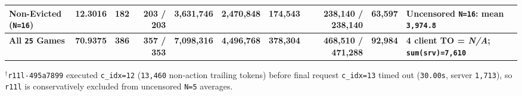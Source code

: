 \documentclass[10pt]{article}
\newcommand{\code}[1]{\texttt{#1}}
\newcommand{\na}{\textit{N/A}}
\begin{document}
\begin{table}[t]
{\begin{tabular}{@{}l r r r r r r r r l@{}}
\textbf{Non-Evicted (\code{N=16})} & \textbf{12.3016} & \textbf{182} & \textbf{203 / 203} & \textbf{3,631,746} & \textbf{2,470,848} & \textbf{174,543} & \textbf{238,140 / 238,140} & \textbf{63,597} & \textbf{Uncensored \code{N=16}: mean \code{3,974.8}} \\
\midrule
\textbf{All \code{25} Games} & \textbf{70.9375} & \textbf{386} & \textbf{357 / 353} & \textbf{7,098,316} & \textbf{4,496,768} & \textbf{378,304} & \textbf{468,510 / 471,288} & \textbf{92,984} & \textbf{4 client TO = \na{}; \code{sum(srv)=7,610}} \\
\bottomrule
\end{tabular}%
}
\par\vspace{2pt}
\raggedright\scriptsize{$^\dagger$\code{r11l-495a7899} executed \code{c\_idx=12} (\code{13,460} non-action trailing tokens) before final request \code{c\_idx=13} timed out (\code{30.00s}, server \code{1,713}), so \code{r11l} is conservatively excluded from uncensored \code{N=5} averages.}
\end{table}
\end{document}

